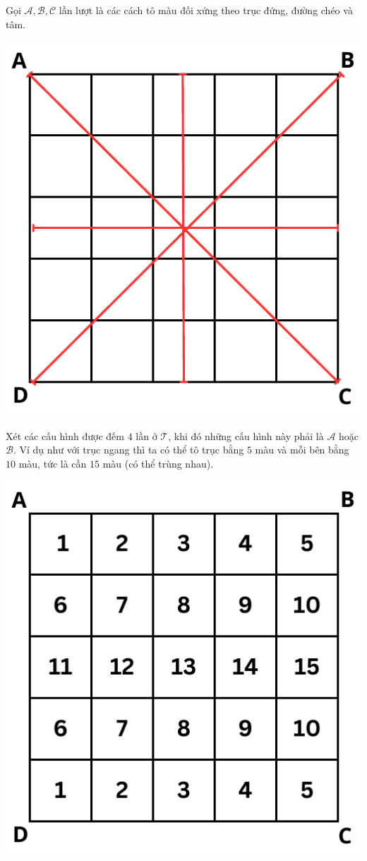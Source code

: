 \documentclass[11pt]{scrartcl}
\begin{document}
\begin{itemize}[label=, leftmargin=0em, itemsep=0.5em]
\begin{sol}
           
            Gọi $\mathcal{A},\mathcal{B},\mathcal{C}$ lần lượt là các cách tô màu đối xứng theo trục đứng, đường chéo và tâm.
            \begin{center}
                \includegraphics[scale=0.57]{ex1.pdf}
            \end{center}
            Xét các cấu hình được đếm $4$ lần ở $\mathcal{T}$, khi đó những cấu hình này phải là $\mathcal{A}$ hoặc $\mathcal{B}$. Ví dụ như với trục ngang thì ta có thể tô trục bằng $5$ màu và mỗi bên bằng $10$ màu, tức là cần $15$ màu (có thể trùng nhau).
            \begin{center}
                \includegraphics[scale=0.57]{trucngang.pdf}

\end{center}
\end{sol}
\end{itemize}
\end{document}
